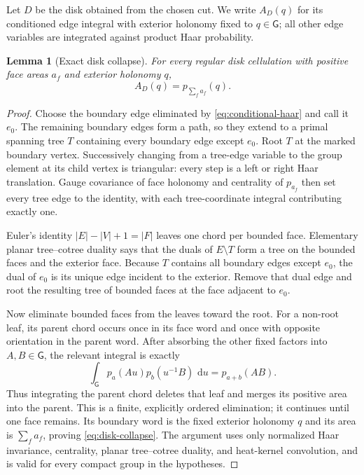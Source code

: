\documentclass[11pt]{article}
\newtheorem{lemma}[theorem]{Lemma}
\theoremstyle{remark}
\newcommand{\G}{\mathsf G}
\newcommand{\dd}{\,\mathrm d}
\begin{document}
Let $D$ be the disk obtained from the chosen cut.  We write $A_D(q)$ for its
conditioned edge integral with exterior holonomy fixed to $q\in\G$; all other
edge variables are integrated against product Haar probability.

\begin{lemma}[Exact disk collapse]\label{lem:disk-collapse}
For every regular disk cellulation with positive face areas $a_f$ and exterior
holonomy $q$,
\begin{equation}\label{eq:disk-collapse}
 A_D(q)=p_{\sum_f a_f}(q).
\end{equation}
\end{lemma}

\begin{proof}
Choose the boundary edge eliminated by \eqref{eq:conditional-haar} and call it
$e_0$.  The remaining boundary edges form a path, so they extend to a primal
spanning tree $T$ containing every boundary edge except $e_0$.  Root $T$ at the
marked boundary vertex.  Successively changing from a tree-edge variable to
the group element at its child vertex is triangular: every step is a left or
right Haar translation.  Gauge covariance of face holonomy and centrality of
$p_{a_f}$ then set every tree edge to the identity, with each tree-coordinate
integral contributing exactly one.

Euler's identity $|E|-|V|+1=|F|$ leaves one chord per bounded face.  Elementary
planar tree--cotree duality says that the duals of $E\setminus T$ form a tree on
the bounded faces and the exterior face.  Because $T$ contains all boundary
edges except $e_0$, the dual of $e_0$ is its unique edge incident to the
exterior.  Remove that dual edge and root the resulting tree of bounded faces
at the face adjacent to $e_0$.

Now eliminate bounded faces from the leaves toward the root.  For a non-root
leaf, its parent chord occurs once in its face word and once with opposite
orientation in the parent word.  After absorbing the other fixed factors into
$A,B\in\G$, the relevant integral is exactly
\[
 \int_\G p_a(Au)p_b(u^{-1}B)\,\dd u=p_{a+b}(AB).
\]
Thus integrating the parent chord deletes that leaf and merges its positive
area into the parent.  This is a finite, explicitly ordered elimination; it
continues until one face remains.  Its boundary word is the fixed exterior
holonomy $q$ and its area is $\sum_fa_f$, proving \eqref{eq:disk-collapse}.
The argument uses only normalized Haar invariance, centrality, planar
tree--cotree duality, and heat-kernel convolution, and is valid for every
compact group in the hypotheses.
\end{proof}
\end{document}
